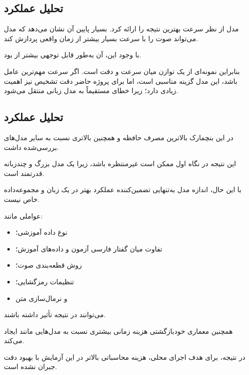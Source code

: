\subsection{تحلیل عملکرد }

مدل  از نظر سرعت بهترین نتیجه را ارائه کرد.
 بسیار پایین آن نشان می‌دهد که مدل می‌تواند صوت را با سرعت
بسیار بیشتر از زمان واقعی پردازش کند.

با وجود این،  آن به‌طور قابل توجهی بیشتر از 
بود.

بنابراین  نمونه‌ای از یک توازن میان سرعت و دقت است.
اگر سرعت مهم‌ترین عامل باشد، این مدل گزینه مناسبی است، اما
برای پروژه حاضر دقت تشخیص نیز اهمیت زیادی دارد؛ زیرا خطای 
مستقیماً به مدل زبانی منتقل می‌شود.


\subsection{تحلیل عملکرد }

 در این بنچمارک بالاترین مصرف حافظه و
همچنین  بالاتری نسبت به سایر مدل‌های بررسی‌شده داشت.

این نتیجه در نگاه اول ممکن است غیرمنتظره باشد، زیرا 
یک مدل بزرگ و چندزبانه قدرتمند است.

با این حال، اندازه مدل به‌تنهایی تضمین‌کننده عملکرد بهتر در
یک زبان و مجموعه‌داده خاص نیست.

عواملی مانند:

\begin{itemize}
    \item نوع داده آموزشی؛
    \item تفاوت میان گفتار فارسی آزمون و داده‌های آموزش؛
    \item روش قطعه‌بندی صوت؛
    \item تنظیمات رمزگشایی؛
    \item و نرمال‌سازی متن
\end{itemize}

می‌توانند در نتیجه تأثیر داشته باشند.

همچنین معماری خودبازگشتی  هزینه زمانی بیشتری نسبت به
مدل‌هایی مانند  ایجاد می‌کند.

در نتیجه، برای هدف اجرای محلی، هزینه محاسباتی بالاتر 
در این آزمایش با بهبود دقت جبران نشده است.


